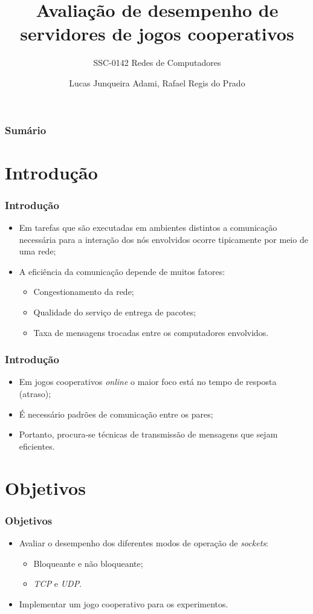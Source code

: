 \documentclass{beamer}
\title{Avaliação de desempenho de servidores de jogos cooperativos}
\subtitle{SSC-0142 Redes de Computadores}
\author{Lucas Junqueira Adami\inst{1}, Rafael Regis do Prado\inst{1}}
\institute
{
	\inst{1}
	Instituto de Ciências Matemáticas e de Computação -- Universidade de São Paulo\\
  	São Carlos, SP
}
\begin{document}
\begin{frame}[plain]
	\titlepage
\end{frame}

\begin{frame}
    \frametitle{Sumário}
    \tableofcontents
\end{frame}
\section{Introdução}

\begin{frame} \frametitle{Introdução}
\begin{itemize}
	\item \justifying Em tarefas que são executadas em ambientes distintos a comunicação necessária para a interação dos nós envolvidos ocorre tipicamente por meio de uma rede;
	\item A eficiência da comunicação depende de muitos fatores:
	\begin{itemize}
		\item Congestionamento da rede;
		\item Qualidade do serviço de entrega de pacotes;
		\item Taxa de mensagens trocadas entre os computadores envolvidos.
	\end{itemize}
\end{itemize}
\end{frame}

\begin{frame} \frametitle{Introdução}
\begin{itemize}
	\item \justifying Em jogos cooperativos \textit{online} o maior foco está no tempo de resposta (atraso);
	\item É necessário padrões de comunicação entre os pares;
	\item \justifying Portanto, procura-se técnicas de transmissão de mensagens que sejam eficientes.
\end{itemize}
\end{frame}

\section{Objetivos}

\begin{frame} \frametitle{Objetivos}
\begin{itemize}
	\item \justifying Avaliar o desempenho dos diferentes modos de operação de \emph{sockets}:
	\begin{itemize}
		\item Bloqueante e não bloqueante;
		\item \emph{TCP} e \emph{UDP}.
	\end{itemize}
	\item \justifying Implementar um jogo cooperativo para os experimentos.
\end{itemize}	
\end{frame}
\end{document}
